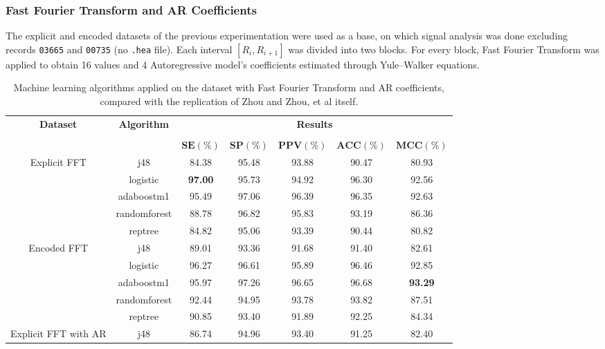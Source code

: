 \subsubsection{Fast Fourier Transform and AR Coefficients}
The explicit and encoded datasets of the previous experimentation were used as a base, on which signal analysis was done excluding records \verb|03665| and \verb|00735| (no \verb|.hea| file). Each interval $[R_i, R_{i+1}]$ was divided into two blocks. For every block, Fast Fourier Transform was applied to obtain 16 values and 4 Autoregressive model's coefficients estimated through Yule–Walker equations. 

\begin{table}[h]
\begin{center}
\begin{threeparttable}
\caption{Machine learning algorithms applied on the dataset with Fast Fourier Transform and AR coefficients, compared with the replication of Zhou and Zhou, et al \cite{zhou2015} itself.}
\label{table:zhou_unimol_fft_ar}
\scriptsize
  \begin{tabular}{c c c c c c c}
  \toprule
  \textbf{Dataset} & \textbf{Algorithm} & \multicolumn{5}{c}{\textbf{Results}} \\
  \cline{3-7}
  \\
  & & $\mathbf{SE(\%)}$ & $\mathbf{SP(\%)}$ & $\mathbf{PPV(\%)}$ & $\mathbf{ACC(\%)}$ & $\mathbf{MCC(\%)}$\\
  \midrule  
  Explicit FFT & j48 & 84.38 & 95.48 & 93.88 & 90.47 & 80.93 \\ 
  & logistic & \textbf{97.00} & 95.73 & 94.92 & 96.30 & 92.56 \\
  & adaboostm1 & 95.49 & 97.06 & 96.39 & 96.35 & 92.63 \\
  & randomforest & 88.78 & 96.82 & 95.83 & 93.19 & 86.36 \\
  & reptree &  84.82 & 95.06 & 93.39 & 90.44 & 80.82 \\
  \hline
  Encoded FFT & j48 & 89.01 & 93.36 & 91.68 & 91.40 & 82.61 \\
  & logistic & 96.27 & 96.61 & 95.89 & 96.46 & 92.85 \\
  & adaboostm1 & 95.97 & 97.26 & 96.65 & 96.68 & \textbf{93.29} \\
  & randomforest & 92.44 & 94.95 & 93.78 & 93.82 & 87.51 \\
  & reptree  & 90.85 & 93.40 & 91.89 & 92.25 & 84.34 \\
  \hline
  Explicit FFT with AR & j48 & 86.74 & 94.96 & 93.40 & 91.25 & 82.40 \\

\end{tabular}
\end{threeparttable}
\end{center}
\end{table}
